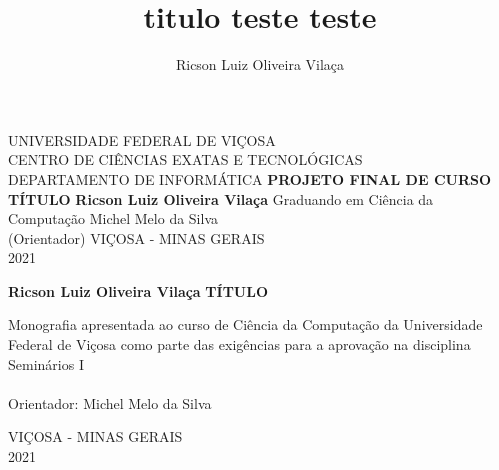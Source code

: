 \documentclass[12pt,a4paper]{article}
\author{Ricson Luiz Oliveira Vilaça}
\title{titulo teste teste}
\begin{document}
	
	\begin{titlepage}
		\begin{center}
			UNIVERSIDADE FEDERAL DE VIÇOSA\\
			CENTRO DE CIÊNCIAS EXATAS E TECNOLÓGICAS\\
			DEPARTAMENTO DE INFORMÁTICA
			\vfill
			{\large \textbf{PROJETO FINAL DE CURSO}}
			\vfill
			{\Large \textbf{TÍTULO}}
			\vfill
			\textbf{Ricson Luiz Oliveira Vilaça} \hfill Graduando em Ciência da Computação
			\vfill
			Michel Melo da Silva\\
			(Orientador)
			\vfill
			VIÇOSA - MINAS GERAIS\\
			2021
		\end{center}
	\end{titlepage}

	\begin{titlepage}
		\begin{center}
			\textbf{Ricson Luiz Oliveira Vilaça}
			\vfill
			{\Large \textbf{TÍTULO}}
			\vfill
			\begin{flushright}
				\begin{minipage}{.5\textwidth}
					Monografia apresentada ao curso de Ciência da Computação da Universidade Federal de Viçosa como parte das exigências para a aprovação na disciplina Seminários I\\\\
					Orientador: Michel Melo da Silva
				\end{minipage}
			\end{flushright}
			\vfill
			VIÇOSA - MINAS GERAIS\\
			2021
		\end{center}
	\end{titlepage}
\end{document}
